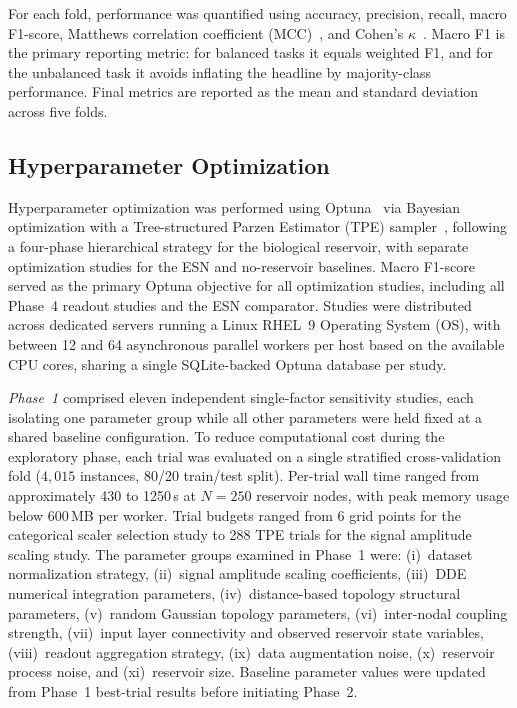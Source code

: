 \documentclass[journal=asbcd6,manuscript=article,keywords]{achemso}
\begin{document}
For each fold, performance was quantified using accuracy, precision, recall, macro F1-score, Matthews correlation coefficient (MCC)~\cite{Matthews1975}, and Cohen's $\kappa$~\cite{Cohen1960}.
Macro F1 is the primary reporting metric: for balanced tasks it equals weighted F1, and for the unbalanced task it avoids inflating the headline by majority-class performance.
Final metrics are reported as the mean and standard deviation across five folds.

\subsection{Hyperparameter Optimization}\label{sec:optimization}
Hyperparameter optimization was performed using Optuna~\cite{Akiba2019} via Bayesian optimization with a Tree-structured Parzen Estimator (TPE) sampler~\cite{Watanabe2023}, following a four-phase hierarchical strategy for the biological reservoir, with separate optimization studies for the ESN and no-reservoir baselines. 
Macro F1-score served as the primary Optuna objective for all optimization studies, including all Phase~4 readout studies and the ESN comparator. 
Studies were distributed across dedicated servers running a Linux RHEL~9 Operating System (OS), with between 12 and 64 asynchronous parallel workers per host based on the available CPU cores, sharing a single SQLite-backed Optuna database per study.

\textit{Phase~1} comprised eleven independent single-factor sensitivity studies, each isolating one parameter group while all other parameters were held fixed at a shared baseline configuration. 
To reduce computational cost during the exploratory phase, each trial was evaluated on a single stratified cross-validation fold ($4,015$ instances, 80/20 train/test split). 
Per-trial wall time ranged from approximately 430 to 1250\,s at $N = 250$ reservoir nodes, with peak memory usage below 600\,MB per worker. 
Trial budgets ranged from 6 grid points for the categorical scaler selection study to 288 TPE trials for the signal amplitude scaling study. 
The parameter groups examined in Phase~1 were: (i)~dataset normalization strategy, (ii)~signal amplitude scaling coefficients, (iii)~DDE numerical integration parameters, (iv)~distance-based topology structural parameters, (v)~random Gaussian topology parameters, (vi)~inter-nodal coupling strength, (vii)~input layer connectivity and observed reservoir state variables, (viii)~readout aggregation strategy, (ix)~data augmentation noise, (x)~reservoir process noise, and (xi)~reservoir size. 
Baseline parameter values were updated from Phase~1 best-trial results before initiating Phase~2.
\end{document}
